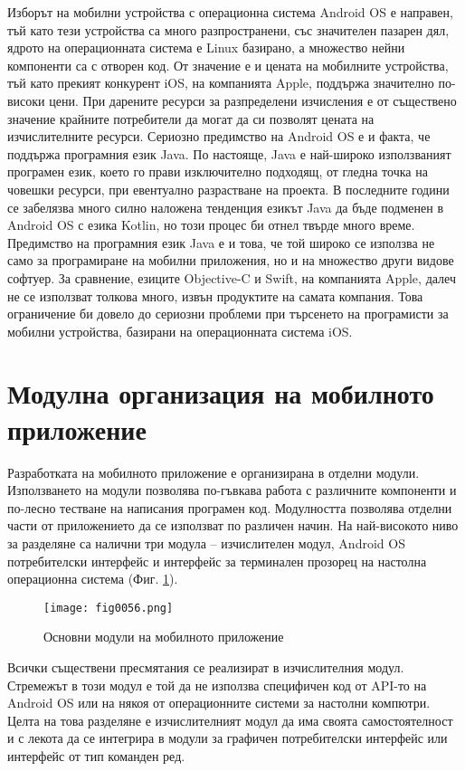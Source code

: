Изборът на мобилни устройства с операционна система Android OS е направен, тъй като тези устройства са много разпространени, със значителен пазарен дял, ядрото на операционната система е Linux базирано, а множество нейни компоненти са с отворен код. От значение е и цената на мобилните устройства, тъй като прекият конкурент iOS, на компанията Apple, поддържа значително по-високи цени. При дарените ресурси за разпределени изчисления е от съществено значение крайните потребители да могат да си позволят цената на изчислителните ресурси. Сериозно предимство на Android OS е и факта, че поддържа програмния език Java. По настояще, Java е най-широко използваният програмен език, което го прави изключително подходящ, от гледна точка на човешки ресурси, при евентуално разрастване на проекта. В последните години се забелязва много силно наложена тенденция езикът Java да бъде подменен в Android OS с езика Kotlin, но този процес би отнел твърде много време. Предимство на програмния език Java е и това, че той широко се използва не само за програмиране на мобилни приложения, но и на множество други видове софтуер. За сравнение, езиците Objective-C и Swift, на компанията Apple, далеч не се използват толкова много, извън продуктите на самата компания. Това ограничение би довело до сериозни проблеми при търсенето на програмисти за мобилни устройства, базирани на операционната система iOS. 

\section{Модулна организация на мобилното приложение}

Разработката на мобилното приложение е организирана в отделни модули. Използването на модули позволява по-гъвкава работа с различните компоненти и по-лесно тестване на написания програмен код. Модулността позволява отделни части от приложението да се използват по различен начин. На най-високото ниво за разделяне са налични три модула – изчислителен модул, Android OS потребителски интерфейс и интерфейс за терминален прозорец на настолна операционна система (Фиг. \ref{fig0056}).

\begin{figure}[H]
  \centering
  \texttt{[image: fig0056.png]}
  \caption{Основни модули на мобилното приложение}
\label{fig0056}
\end{figure}

Всички съществени пресмятания се реализират в изчислителния модул. Стремежът в този модул е той да не използва специфичен код от API-то на Android OS или на някоя от операционните системи за настолни компютри. Целта на това разделяне е изчислителният модул да има своята самостоятелност и с лекота да се интегрира в модули за графичен потребителски интерфейс или интерфейс от тип команден ред. 


